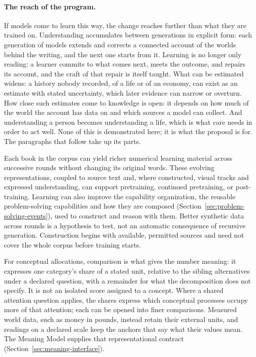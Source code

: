\documentclass[10pt]{article}
\begin{document}
\paragraph{The reach of the program.}
If models come to learn this way, the change reaches further than what they are
trained on. Understanding accumulates between generations in explicit form: each
generation of models extends and corrects a connected account of the worlds behind the
writing, and the next one starts from it. Learning is no longer only reading: a
learner commits to what comes next, meets the outcome, and repairs its account, and
the craft of that repair is itself taught. What can be estimated widens: a history
nobody recorded, of a life or of an economy, can exist as an estimate with stated
uncertainty, which later evidence can narrow or overturn. How close such estimates
come to knowledge is open: it depends on how much of the world the account has data
on and which sources a model can collect. And understanding a person
becomes understanding a life, which is what care needs in order to act well. None of
this is demonstrated here; it is what the proposal is for. The paragraphs that follow
take up its parts.

Each book in the corpus can yield richer numerical learning material across successive
rounds without changing its original words. These evolving representations,
coupled to source text and, where constructed, visual tracks and expressed
understanding, can support pretraining, continued pretraining, or post-training.
Learning can also improve the capability organization, the reusable
problem-solving capabilities and how they are composed
(Section~\ref{sec:problem-solving-events}), used to construct and reason with them. Better synthetic data
across rounds is a hypothesis to test, not an automatic consequence of recursive
generation. Construction begins with available, permitted sources and need not
cover the whole corpus before training starts.

For conceptual
allocations, comparison is what gives the number
meaning: it expresses one category's share of a stated unit, relative to the sibling alternatives
under a declared question, with a remainder for what the decomposition does
not specify. It is not an isolated score assigned to a concept. Where a shared
attention question applies, the shares express which conceptual processes
occupy more of that attention; each can be opened into finer comparisons.
Measured world data, such as money in pounds, instead retain their external
units, and readings on a declared scale keep the anchors that say what their
values mean. The Meaning Model supplies that representational contract
(Section~\ref{sec:meaning-interface}).
\end{document}
